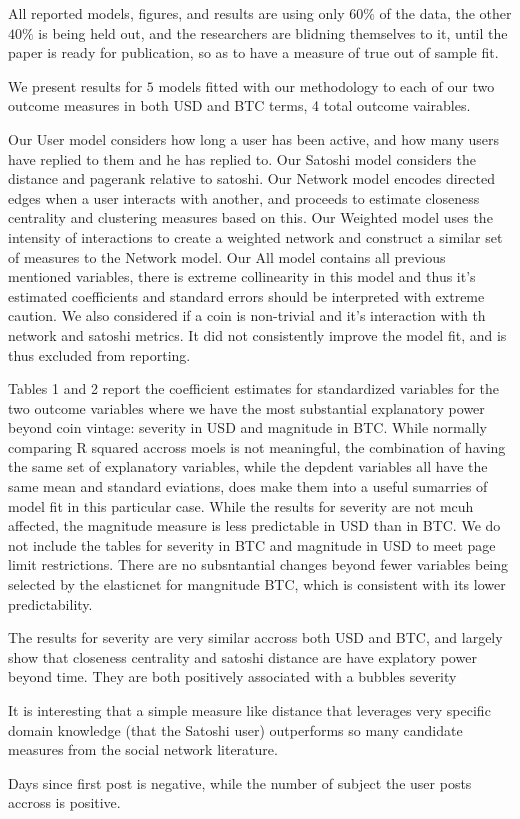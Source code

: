 All reported models, figures, and results are using only $60\%$ of the data, the other $40\%$ is being held out, and the researchers are blidning themselves to it, until the paper is ready for publication, so as to have a measure of true out of sample fit. 

We present results for $5$ models fitted with our methodology to each of our two outcome measures in both USD and BTC terms, 4 total outcome vairables.

Our User model considers how long a user has been active, and how many users have replied to them and he has replied to. 
Our Satoshi model considers the distance and pagerank relative to satoshi.
Our Network model encodes directed edges when a user interacts with another, and proceeds to estimate closeness centrality and clustering measures based on this. 
Our Weighted model uses the intensity of interactions to create a weighted network and construct a similar set of measures to the Network model.
Our All model contains all previous mentioned variables, there is extreme collinearity in this model and thus it's estimated coefficients and standard errors should be interpreted with extreme caution. 
We also considered if a coin is non-trivial and it's interaction with th network and satoshi metrics. It did not consistently improve the model fit, and is thus excluded from reporting. 

Tables 1 and 2 report the coefficient estimates for standardized variables for the two outcome variables where we have the most substantial explanatory power beyond coin vintage: severity in USD and magnitude in BTC. While normally comparing R squared accross moels is not meaningful, the combination of having the same set of explanatory variables, while the depdent variables all have the same mean and standard eviations, does make them into a useful sumarries of model fit in this particular case. 
While the results for severity are not mcuh affected, the magnitude measure is less predictable in USD than in BTC.
We do not include the tables for severity in BTC and magnitude in USD to meet page limit restrictions.
There are no subsntantial changes beyond fewer variables being selected by the elasticnet for mangnitude BTC, which is consistent with its lower predictability.

The results for severity are very similar accross both USD and BTC, and largely show that closeness centrality and satoshi distance are have explatory power beyond time. They are both positively associated with a bubbles severity


It is interesting that a simple measure like distance that leverages very specific domain knowledge (that the Satoshi user) outperforms so many candidate measures from the social network literature.


Days since first post is negative, while the number of subject the user posts accross is positive.











